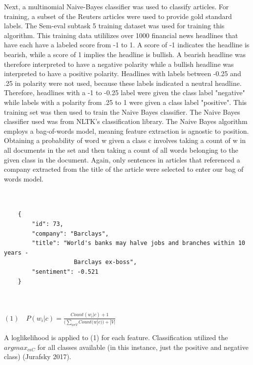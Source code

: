 \documentclass{article}
\begin{document}
    
    Next, a multinomial Naive-Bayes classifier was used to classify articles. For training, a subset of the Reuters articles were used to provide gold standard labels. The Sem-eval subtask 5 training dataset was used for training this algorithm. This training data utililizes over 1000 financial news headlines that have each have a labeled score from -1 to 1. A score of -1 indicates the headline is bearish, while a score of 1 implies the headline is bullish. A bearish headline was therefore interpreted to have a negative polarity while a bullish headline was interpreted to have a positive polarity. Headlines with labels between -0.25 and .25 in polarity were not used, because these labels indicated a neutral headline. Therefore, headlines with a -1 to -0.25 label were given the class label "negative" while labels with a polarity from .25 to 1 were given a class label "positive".  This training set was then used to train the Naive Bayes classifier. The Naive Bayes classifier used was from NLTK's classification library. The Naive Bayes algorithm employs a bag-of-words model, meaning feature extraction is agnostic to position. Obtaining a probability of word w given a class c involves taking a count of w in all documents in the set and then taking a count of all words belonging to the given class in the document. Again, only sentences in articles that referenced a company extracted from the title of the article were selected to enter our bag of words model. 
    
    \begin{lstlisting}[caption={An example of a training object from the Sem-Eval task 5 dataset.}]
    
    
    {
        "id": 73,
        "company": "Barclays",
        "title": "World's banks may halve jobs and branches within 10 years - 
                    Barclays ex-boss",
        "sentiment": -0.521
    }
    
    
    \end{lstlisting}
    
    \medskip
    
    \begin{math}
    (1) \quad  P(w_i | c) = \frac{Count(w_i | c) + 1}{(\sum_{w \epsilon  V} Count(w | c)) + |V|}
    \end{math}
    
    \medskip
    
    A loglikelihood is applied to (1) for each feature. Classification utilized the $argmax_{c \epsilon C}$ for all classes available (in this instance, just the positive and negative class) (Jurafsky 2017). 
    
\end{document}
